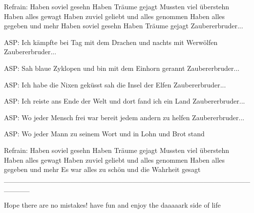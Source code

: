 Refrain:
Haben soviel gesehn
Haben Träume gejagt
Mussten viel überstehn
Haben alles gewagt
Haben zuviel geliebt
und alles genommen
Haben alles gegeben und mehr
Haben soviel gesehn
Haben Träume gejagt
Zaubererbruder...

ASP:
Ich kämpfte bei Tag mit dem Drachen
und nachts mit Werwölfen
Zaubererbruder...

ASP:
Sah blaue Zyklopen
und bin mit dem Einhorn gerannt
Zaubererbruder...

ASP:
Ich habe die Nixen geküsst
sah die Insel der Elfen
Zaubererbruder...

ASP:
Ich reiste ans Ende der Welt
und dort fand ich ein Land
Zaubererbruder...

ASP:
Wo jeder Mensch frei war
bereit jedem andern zu helfen
Zaubererbruder...

ASP:
Wo jeder Mann zu seinem Wort
und in Lohn und Brot stand

Refrain:
Haben soviel gesehn
Haben Träume gejagt
Mussten viel überstehn
Haben alles gewagt
Haben zuviel geliebt
und alles genommen
Haben alles gegeben und mehr
Es war alles zu schön
und die Wahrheit gesagt
_____________________________________________________

Hope there are no mistakes!
have fun and enjoy the daaaaark side of life
